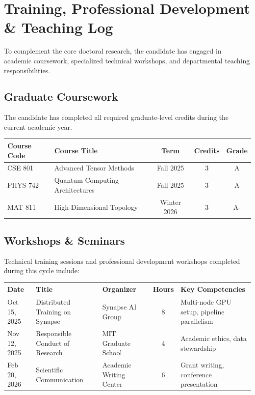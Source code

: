 \section{Training, Professional Development \& Teaching Log}

To complement the core doctoral research, the candidate has engaged in academic coursework, specialized technical workshops, and departmental teaching responsibilities.

\subsection{Graduate Coursework}
The candidate has completed all required graduate-level credits during the current academic year.

\medskip
\centering
\begin{tabular}{l l c c c}
  \toprule
  \textbf{Course Code} & \textbf{Course Title} & \textbf{Term} & \textbf{Credits} & \textbf{Grade} \\
  \midrule
  CSE 801 & Advanced Tensor Methods & Fall 2025 & 3 & A \\
  PHYS 742 & Quantum Computing Architectures & Fall 2025 & 3 & A \\
  MAT 811 & High-Dimensional Topology & Winter 2026 & 3 & A- \\
  \bottomrule
\end{tabular}
\flushleft
\medskip

\subsection{Workshops \& Seminars}
Technical training sessions and professional development workshops completed during this cycle include:

\medskip
\begin{tabularx}{\textwidth}{p{2.2cm} X p{3.2cm} c p{3.0cm}}
  \toprule
  \textbf{Date} & \textbf{Title} & \textbf{Organizer} & \textbf{Hours} & \textbf{Key Competencies} \\
  \midrule
  Oct 15, 2025 & Distributed Training on Synapse & Synapse AI Group & 8 & Multi-node GPU setup, pipeline parallelism \\
  Nov 12, 2025 & Responsible Conduct of Research & MIT Graduate School & 4 & Academic ethics, data stewardship \\
  Feb 20, 2026 & Scientific Communication & Academic Writing Center & 6 & Grant writing, conference presentation \\
  \bottomrule
\end{tabularx}
\medskip

